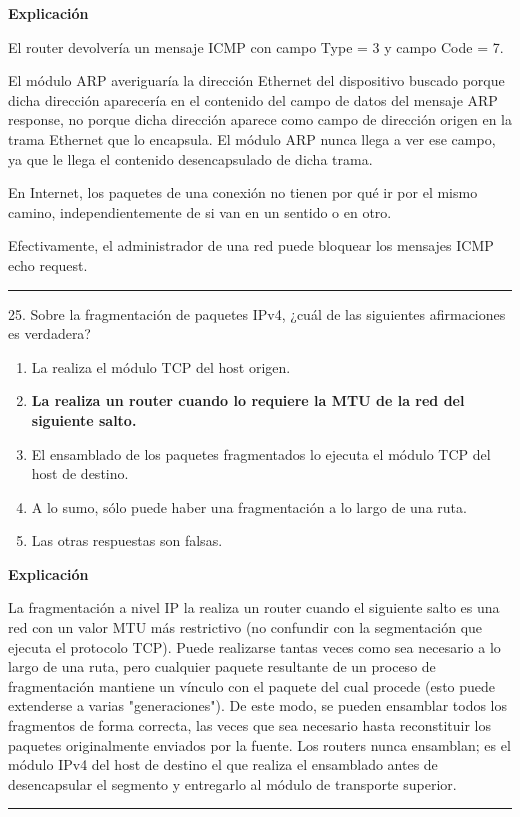 \documentclass[10pt,a4paper]{article}
\begin{document}
\textbf{Explicación}

El router devolvería un mensaje ICMP con campo Type = 3 y campo Code = 7.

El módulo ARP averiguaría la dirección Ethernet del dispositivo buscado porque dicha dirección aparecería en el contenido del campo de datos del mensaje ARP response, no porque dicha dirección aparece como campo de dirección origen en la trama Ethernet que lo encapsula. El módulo ARP nunca llega a ver ese campo, ya que le llega el contenido desencapsulado de dicha trama.

En Internet, los paquetes de una conexión no tienen por qué ir por el mismo camino, independientemente de si van en un sentido o en otro.

Efectivamente, el administrador de una red puede bloquear los mensajes ICMP echo request.


\vspace{15pt} \hrule \vspace{15pt}




25.  Sobre la fragmentación de paquetes IPv4, ¿cuál de las siguientes afirmaciones es verdadera?


\begin{enumerate}[label=\alph*]
    \item La realiza el módulo TCP del host origen.
    \item \textbf{La realiza un router cuando lo requiere la MTU de la red del siguiente salto.}
    \item El ensamblado de los paquetes fragmentados lo ejecuta el módulo TCP del host de destino.
    \item A lo sumo, sólo puede haber una fragmentación a lo largo de una ruta.
    \item Las otras respuestas son falsas.
\end{enumerate}

\textbf{Explicación}

La fragmentación a nivel IP la realiza un router cuando el siguiente salto es una red con un valor MTU más restrictivo (no confundir con la segmentación que ejecuta el protocolo TCP). Puede realizarse tantas veces como sea necesario a lo largo de una ruta, pero cualquier paquete resultante de un proceso de fragmentación mantiene un vínculo con el paquete del cual procede (esto puede extenderse a varias "generaciones"). De este modo, se pueden ensamblar todos los fragmentos de forma correcta, las veces que sea necesario hasta reconstituir los paquetes originalmente enviados por la fuente. Los routers nunca ensamblan; es el módulo IPv4 del host de destino el que realiza el ensamblado antes de desencapsular el segmento y entregarlo al módulo de transporte superior.

\vspace{15pt} \hrule \vspace{15pt}
\end{document}
